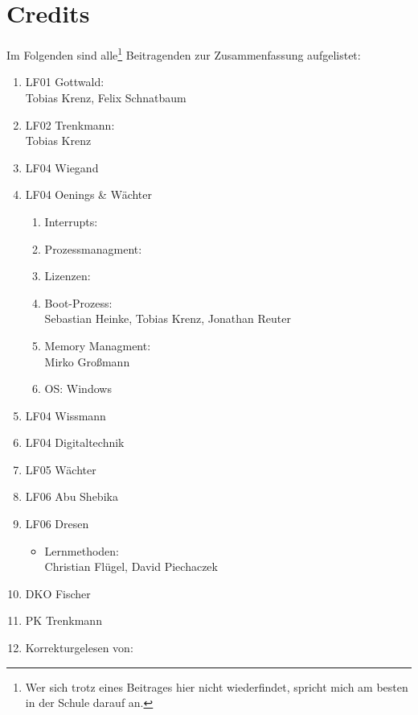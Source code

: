 \section{Credits}
Im Folgenden sind alle\footnote{Wer sich trotz eines Beitrages hier nicht wiederfindet, spricht mich am besten in der Schule darauf an.} Beitragenden zur Zusammenfassung aufgelistet:

\begin{enumerate}
	\item LF01 Gottwald:\\
Tobias Krenz, Felix Schnatbaum
	\item LF02 Trenkmann:\\
Tobias Krenz
	\item LF04 Wiegand
	\item LF04 Oenings \& Wächter
	\begin{enumerate}
		\item Interrupts:
		\item Prozessmanagment:
		\item Lizenzen:
		\item Boot-Prozess:\\
Sebastian Heinke, Tobias Krenz, Jonathan Reuter
		\item Memory Managment:\\
Mirko Großmann
		\item OS: Windows
	\end{enumerate}
	\item LF04 Wissmann
	\item LF04 Digitaltechnik
	\item LF05 Wächter
	\item LF06 Abu Shebika
	\item LF06 Dresen
	\begin{itemize}
		\item Lernmethoden:\\
Christian Flügel, David Piechaczek
	\end{itemize}
	\item DKO Fischer
	\item PK Trenkmann
	\item Korrekturgelesen von:
\end{enumerate}